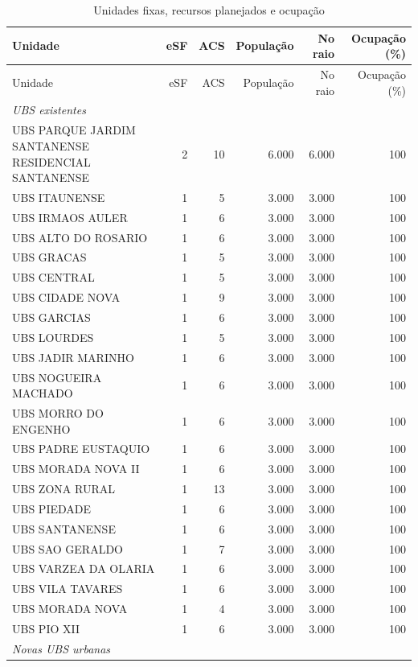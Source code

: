 \begingroup\small\begin{longtable}{p{.42\linewidth}rrrrr}
\caption{Unidades fixas, recursos planejados e ocupação}\label{tab:unidades}\\
\toprule Unidade & eSF & ACS & População & No raio & Ocupação (\%)\\\midrule\endfirsthead
\toprule Unidade & eSF & ACS & População & No raio & Ocupação (\%)\\\midrule\endhead
\multicolumn{6}{l}{\textit{UBS existentes}}\\
UBS PARQUE JARDIM SANTANENSE RESIDENCIAL SANTANENSE & 2 & 10 & 6.000 & 6.000 & 100\\
UBS ITAUNENSE & 1 & 5 & 3.000 & 3.000 & 100\\
UBS IRMAOS AULER & 1 & 6 & 3.000 & 3.000 & 100\\
UBS ALTO DO ROSARIO & 1 & 6 & 3.000 & 3.000 & 100\\
UBS GRACAS & 1 & 5 & 3.000 & 3.000 & 100\\
UBS CENTRAL & 1 & 5 & 3.000 & 3.000 & 100\\
UBS CIDADE NOVA & 1 & 9 & 3.000 & 3.000 & 100\\
UBS GARCIAS & 1 & 6 & 3.000 & 3.000 & 100\\
UBS LOURDES & 1 & 5 & 3.000 & 3.000 & 100\\
UBS JADIR MARINHO & 1 & 6 & 3.000 & 3.000 & 100\\
UBS NOGUEIRA MACHADO & 1 & 6 & 3.000 & 3.000 & 100\\
UBS MORRO DO ENGENHO & 1 & 6 & 3.000 & 3.000 & 100\\
UBS PADRE EUSTAQUIO & 1 & 6 & 3.000 & 3.000 & 100\\
UBS MORADA NOVA II & 1 & 6 & 3.000 & 3.000 & 100\\
UBS ZONA RURAL & 1 & 13 & 3.000 & 3.000 & 100\\
UBS PIEDADE & 1 & 6 & 3.000 & 3.000 & 100\\
UBS SANTANENSE & 1 & 6 & 3.000 & 3.000 & 100\\
UBS SAO GERALDO & 1 & 7 & 3.000 & 3.000 & 100\\
UBS VARZEA DA OLARIA & 1 & 6 & 3.000 & 3.000 & 100\\
UBS VILA TAVARES & 1 & 6 & 3.000 & 3.000 & 100\\
UBS MORADA NOVA & 1 & 4 & 3.000 & 3.000 & 100\\
UBS PIO XII & 1 & 6 & 3.000 & 3.000 & 100\\
\midrule
\multicolumn{6}{l}{\textit{Novas UBS urbanas}}\\

\end{longtable}
